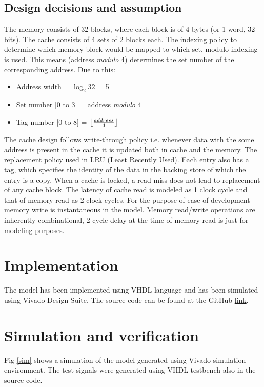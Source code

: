 \documentclass[letterpaper,preprint,11pt]{elsarticle}
\DeclarePairedDelimiter\floor{\lfloor}{\rfloor}
\begin{document}
\subsection{Design decisions and assumption}
The memory consists of 32 blocks, where each block is of 4 bytes (or 1 word, 32 bits). The cache consists of 4 sets of 2 blocks each. The indexing policy to determine which memory block would be mapped to which set, modulo indexing is used. This means (address \textit{modulo} 4) determines the set number of the corresponding address. Due to this:
\begin{itemize}
\item Address width = $\log_2 32$ = 5
\item Set number [0 to 3] = address \textit{modulo} 4
\item Tag number [0 to 8] = $\floor*{\frac{address}{4}}$
\end{itemize}
The cache design follows write-through policy i.e. whenever data with the some address is present in the cache it is updated both in cache and the memory. The replacement policy used in LRU (Least Recently Used). Each entry also has a tag, which specifies the identity of the data in the backing store of which the entry is a copy. When a cache is locked, a read miss does not lead to replacement of any cache block.
\newline
\newline
The latency of cache read is modeled as 1 clock cycle and that of memory read as 2 clock cycles. For the purpose of ease of development memory write is instantaneous in the model. Memory read/write operations are inherently combinational, 2 cycle delay at the time of memory read is just for modeling purposes.

\section{Implementation}
The model has been implemented using VHDL language and has been simulated using Vivado Design Suite. The source code can be found at the GitHub \href{https://github.com/shreshthtuli/4-Way-set-associative-lockable-cache}{link}.

\section{Simulation and verification}

Fig \ref{sim} shows a simulation of the model generated using Vivado simulation environment. The test signals were generated using VHDL testbench also in the source code.
\end{document}
